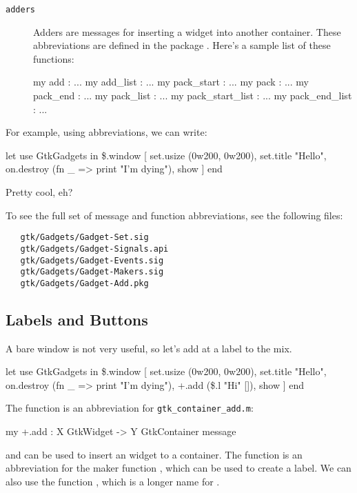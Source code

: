 \documentclass{article}
\begin{document}
\begin{description}
 \item[\tt adders]
  Adders are messages for inserting a widget into another container.
These abbreviations are defined in the package \Sml{+}.  Here's
a sample list of these functions:
\begin{smldisp}
   my add  : ...
   my add_list  : ...
   my pack_start : ...
   my pack : ...
   my pack_end  : ...
   my pack_list : ...
   my pack_start_list : ...
   my pack_end_list  : ...
\end{smldisp}
\end{description}

For example, using abbreviations, we can write:
\begin{smldisp}
   let use GtkGadgets
   in  \$.window
        [ set.usize (0w200, 0w200),
          set.title "Hello",
          on.destroy (fn _ => print "I'm dying"),
          show
        ] 
   end
\end{smldisp}

Pretty cool, eh?

To see the full set of message and function abbreviations, see the 
following files:
\begin{verbatim}
   gtk/Gadgets/Gadget-Set.sig
   gtk/Gadgets/Gadget-Signals.api
   gtk/Gadgets/Gadget-Events.sig
   gtk/Gadgets/Gadget-Makers.sig
   gtk/Gadgets/Gadget-Add.pkg
\end{verbatim}

\subsection{Labels and Buttons}
A bare window is not very useful, so let's add at a label to the mix.

\begin{smldisp}
   let use GtkGadgets
   in  \$.window
        [ set.usize (0w200, 0w200),
          set.title "Hello",
          on.destroy (fn _ => print "I'm dying"),
          +.add (\$.l "Hi" []),
          show
        ] 
   end
\end{smldisp}

The function  is an abbreviation for \verb|gtk_container_add.m|:
\begin{smldisp}
   my +.add : X GtkWidget -> Y GtkContainer message
\end{smldisp}
\noindent and can be used to insert an widget to a container.
The function  is an abbreviation for the maker function
, which can be used to create a label.  We can also
use the function , which is a longer name for .
\end{document}
